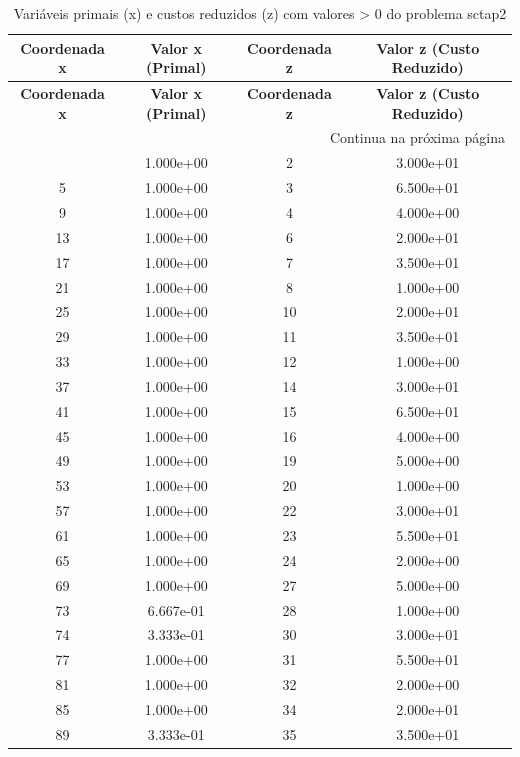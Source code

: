 \documentclass[12pt]{article}
\begin{document}
\begin{longtable}{@{}cccc@{}}
\caption{Variáveis primais (x) e custos reduzidos (z) com valores > 0 do problema sctap2} \\
\toprule
\textbf{Coordenada x} & \textbf{Valor x (Primal)} & \textbf{Coordenada z} & \textbf{Valor z (Custo Reduzido)} \\
\midrule
\endfirsthead

\toprule
\textbf{Coordenada x} & \textbf{Valor x (Primal)} & \textbf{Coordenada z} & \textbf{Valor z (Custo Reduzido)} \\
\midrule
\endhead

\midrule \multicolumn{4}{r}{{Continua na próxima página}} \\ \midrule
\endfoot

\bottomrule
\endlastfoot
1 & 1.000e+00 & 2 & 3.000e+01 \\
5 & 1.000e+00 & 3 & 6.500e+01 \\
9 & 1.000e+00 & 4 & 4.000e+00 \\
13 & 1.000e+00 & 6 & 2.000e+01 \\
17 & 1.000e+00 & 7 & 3.500e+01 \\
21 & 1.000e+00 & 8 & 1.000e+00 \\
25 & 1.000e+00 & 10 & 2.000e+01 \\
29 & 1.000e+00 & 11 & 3.500e+01 \\
33 & 1.000e+00 & 12 & 1.000e+00 \\
37 & 1.000e+00 & 14 & 3.000e+01 \\
41 & 1.000e+00 & 15 & 6.500e+01 \\
45 & 1.000e+00 & 16 & 4.000e+00 \\
49 & 1.000e+00 & 19 & 5.000e+00 \\
53 & 1.000e+00 & 20 & 1.000e+00 \\
57 & 1.000e+00 & 22 & 3.000e+01 \\
61 & 1.000e+00 & 23 & 5.500e+01 \\
65 & 1.000e+00 & 24 & 2.000e+00 \\
69 & 1.000e+00 & 27 & 5.000e+00 \\
73 & 6.667e-01 & 28 & 1.000e+00 \\
74 & 3.333e-01 & 30 & 3.000e+01 \\
77 & 1.000e+00 & 31 & 5.500e+01 \\
81 & 1.000e+00 & 32 & 2.000e+00 \\
85 & 1.000e+00 & 34 & 2.000e+01 \\
89 & 3.333e-01 & 35 & 3.500e+01 \\

\end{longtable}
\end{document}
